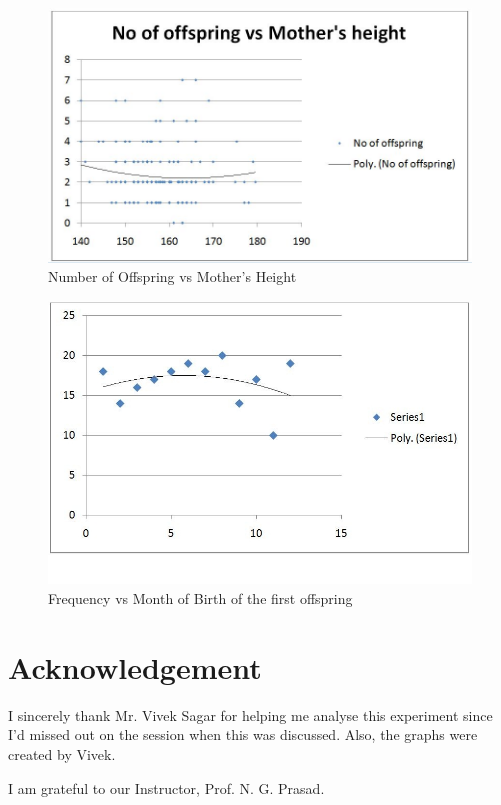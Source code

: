 \begin{figure}[bth]
	\begin{center}
		\includegraphics[width=1.1\linewidth]{gfx/Fitness_mother}
	\end{center}
\caption[Number of Offspring vs Mother's Height]{Number of Offspring vs Mother's Height}
\label{human_mother}
\end{figure}

\begin{figure}[bth]
	\begin{center}
		\includegraphics[width=1.1\linewidth]{gfx/Monthofbirth_first_offspring}
	\end{center}
\caption[Frequency vs Month of Birth of the first offspring]{Frequency vs Month of Birth of the first offspring}
\label{human_last}
\end{figure}

\section{Acknowledgement}
	I sincerely thank Mr. Vivek Sagar for helping me analyse this experiment since I'd missed out on the session when this was discussed. Also, the graphs were created by Vivek.
	\par
	I am grateful to our Instructor, Prof. N. G. Prasad.